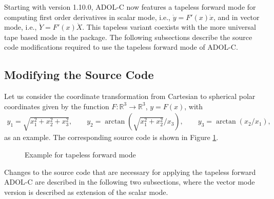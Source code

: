 \documentclass[11pt,twoside]{article}
\begin{document}
Starting with version 1.10.0, ADOL-C now features a tapeless forward
mode for computing first order derivatives in scalar mode, i.e.,
$\dot{y} = F'(x)\dot{x}$, and in vector mode, i.e., $\dot{Y} = F'(x)\dot{X}$. 
This tapeless variant coexists with the more universal
tape based mode in the package. The following subsections describe
the source code modifications required to use the tapeless forward mode of
ADOL-C.  
%
\subsection{Modifying the Source Code}
%
Let us consider the coordinate transformation from Cartesian to spherical
polar coordinates given by the function $F: \mathbb{R}^3 \to \mathbb{R}^3$, $y
= F(x)$, with
\begin{eqnarray*}
y_1  =  \sqrt{x_1^2 + x_2^2 + x_3^2},\qquad
y_2  =  \arctan\left(\sqrt{x_1^2 + x_2^2}/x_3\right),\qquad
y_3  =  \arctan(x_2/x_1),
\end{eqnarray*}
as an example. The corresponding source code is shown in Figure \ref{fig:tapeless}.
\begin{figure}[htb]
\caption{Example for tapeless forward mode}
\label{fig:tapeless}
\end{figure}
%
Changes to the source code that are necessary for applying the
tapeless forward ADOL-C are described in the following two
subsections, where the vector mode version is described
as extension of the scalar mode. 
%
\end{document}
